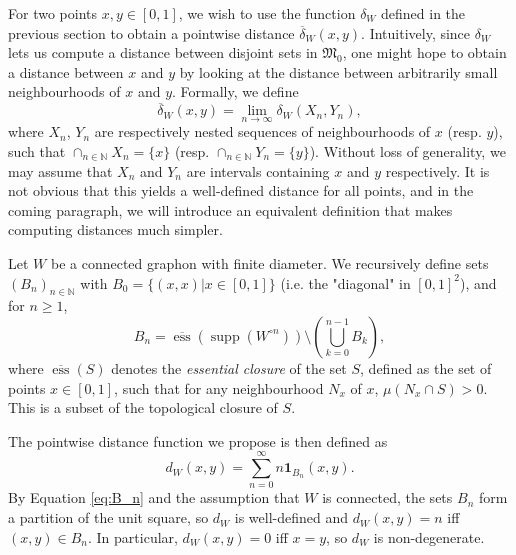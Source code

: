 \documentclass[11pt]{article}
\def\N{\mathbb{N}}
\def\supp{\operatorname{supp}}
\def\ess{\operatorname{ess}}
\def\II{\bm{1}}
\def\frakM{\mathfrak{M}_0}
\theoremstyle{definition}
\begin{document}
For two points $x,y \in [0,1]$, we wish to use the function $\delta_W$ defined in the previous section to obtain a pointwise distance $\overline{\delta}_W (x,y)$. Intuitively, since $\delta_W$ lets us compute a distance between disjoint sets in $\frakM$, one might hope to obtain a distance between $x$ and $y$ by looking at the distance between arbitrarily small neighbourhoods of $x$ and $y$. Formally, we define
\begin{equation} \label{eq:delta_W-pointwise}
\overline{\delta}_W (x,y) = \lim_{n\rightarrow \infty} \delta_W (X_n,Y_n),
\end{equation}
where $X_n$, $Y_n$ are respectively nested sequences of neighbourhoods of $x$ (resp. $y$), such that $\cap_{n\in\N} X_n = \{x\}$ (resp. $\cap_{n\in\N} Y_n = \{y\}$). Without loss of generality, we may assume that $X_n$ and $Y_n$ are intervals containing $x$ and $y$ respectively. It is not obvious that this yields a well-defined distance for all points, and in the coming paragraph, we will introduce an equivalent definition that makes computing distances much simpler.

Let $W$ be a connected graphon with finite diameter. We recursively define sets $(B_n)_{n\in\N}$ with $B_0 = \{(x,x) | x\in [0,1]\}$ (i.e. the "diagonal" in $[0,1]^2$), and for $n\ge 1$,
\begin{equation} \label{eq:B_n} 
    B_n = \overline{\ess} \left(\supp (W^{\circ n}) \right) \setminus \left(\bigcup_{k=0}^{n-1} B_k\right),
\end{equation}
where $\overline{\ess} (S)$ denotes the \textit{essential closure} of the set $S$, defined as the set of points $x \in [0,1]$, such that for any neighbourhood $N_x$ of $x$, $\mu (N_x \cap S) > 0$. This is a subset of the topological closure of $S$.

The pointwise distance function we propose is then defined as 
\begin{equation} \label{eq:d_W}
    d_W (x,y) = \sum_{n=0}^\infty n \II_{B_n} (x,y). 
\end{equation}    
By Equation \eqref{eq:B_n} and the assumption that $W$ is connected, the sets $B_n$ form a partition of the unit square, so $d_W$ is well-defined and $d_W (x,y) = n$ iff $(x,y) \in B_n$. In particular, $d_W (x,y) = 0$ iff $x=y$, so $d_W$ is non-degenerate.
\end{document}
